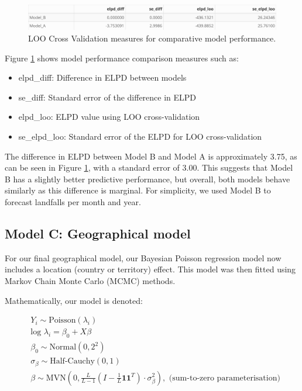 \documentclass[
]{article}
\providecommand{\tightlist}{%
  \setlength{\itemsep}{0pt}\setlength{\parskip}{0pt}}
\begin{document}
\begin{figure}

{\centering \includegraphics[width=1\linewidth]{../outputs/bayesian-analysis-monthly-freq/best-model-comp} 

}

\caption{LOO Cross Validation measures for comparative model performance.}\label{fig:figs13}
\end{figure}

Figure \ref{fig:figs13} shows model performance comparison measures such as:

\begin{itemize}
\tightlist
\item
  elpd\_diff: Difference in ELPD between models
\item
  se\_diff: Standard error of the difference in ELPD
\item
  elpd\_loo: ELPD value using LOO cross-validation
\item
  se\_elpd\_loo: Standard error of the ELPD for LOO cross-validation
\end{itemize}

The difference in ELPD between Model B and Model A is approximately 3.75, as can be seen in Figure \ref{fig:figs13}, with a standard error of 3.00. This suggests that Model B has a slightly better predictive performance, but overall, both models behave similarly as this difference is marginal. For simplicity, we used Model B to forecast landfalls per month and year.

\subsection{Model C: Geographical model}\label{model-c-geographical-model}

For our final geographical model, our Bayesian Poisson regression model now includes a location (country or territory) effect. This model was then fitted using Markov Chain Monte Carlo (MCMC) methods.

Mathematically, our model is denoted:

\begin{align*}
&Y_{i} \sim \text{Poisson}(\lambda_{i})\\
&\text{log } \lambda_{i} =  \beta_0 + X \beta\\
&\beta_0 \sim \text{Normal}(0,2^2)\\
&\sigma_{\beta} \sim \text{Half-Cauchy}(0,1)\\
&\beta \sim \text{MVN}( 0, \frac{L}{L-1}( I - \frac{1}{L} \mathbf{1}\mathbf{1}^T) \cdot \sigma_{\beta}^2), \text{ (sum-to-zero parameterisation)}\\
\end{align*}
\end{document}
